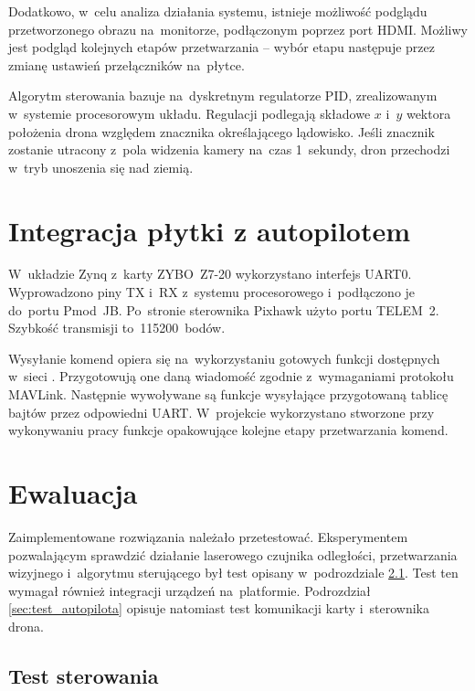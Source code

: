 Dodatkowo, w~celu analiza działania systemu, istnieje możliwość podglądu przetworzonego obrazu na~monitorze, podłączonym poprzez port HDMI. 
Możliwy jest podgląd kolejnych etapów przetwarzania -- wybór etapu następuje przez zmianę ustawień przełączników na~płytce.

Algorytm sterowania bazuje na~dyskretnym regulatorze PID, zrealizowanym w~systemie procesorowym układu.
Regulacji podlegają składowe $x$ i~$y$ wektora położenia drona względem znacznika określającego lądowisko. 
Jeśli znacznik zostanie utracony z~pola widzenia kamery na~czas 1~sekundy, dron przechodzi w~tryb unoszenia się nad ziemią.

\section{Integracja płytki z autopilotem}
\label{sec:integracja_plytka_autopilot}

W~układzie Zynq z~karty ZYBO~Z7-20 wykorzystano interfejs UART0. 
Wyprowadzono piny TX i~RX z~systemu procesorowego i~podłączono je do~portu Pmod~JB. 
Po~stronie sterownika Pixhawk użyto portu TELEM~2. 
Szybkość transmisji to~115200~bodów.

Wysyłanie komend opiera się na~wykorzystaniu gotowych funkcji dostępnych w~sieci \cite{github_mavlink}.
Przygotowują one daną wiadomość zgodnie z~wymaganiami protokołu MAVLink. 
Następnie wywoływane są funkcje wysyłające przygotowaną tablicę bajtów przez odpowiedni UART. 
W~projekcie wykorzystano stworzone przy wykonywaniu pracy \cite{mgr} funkcje opakowujące kolejne etapy przetwarzania komend.
\section{Ewaluacja}
\label{sec:ewaluacja_sprzetu}
Zaimplementowane rozwiązania należało przetestować. Eksperymentem pozwalającym sprawdzić działanie laserowego czujnika odległości, przetwarzania wizyjnego i~algorytmu sterującego był test opisany w~podrozdziale \ref{sec:test_sterowania}. Test ten wymagał również integracji urządzeń na~platformie. Podrozdział \ref{sec:test_autopilota} opisuje natomiast test komunikacji karty i~sterownika drona. 
\subsection{Test sterowania}
\label{sec:test_sterowania}

